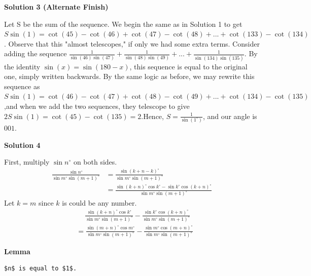 \begin{enumerate}
 



\textbf{Solution 3 (Alternate Finish)}

Let S be the sum of the sequence. We begin the same as in Solution 1 to get$S\sin(1)=\cot(45)-\cot(46)+\cot(47)-\cot(48)+...+\cot(133)-\cot(134)$. Observe that this "almost telescopes," if only we had some extra terms. Consider adding the sequence $\frac{1}{\sin(46)\sin(47)}+\frac{1}{\sin(48)\sin(49)}+...+\frac{1}{\sin(134)\sin(135)}$. By the identity $\sin(x)=\sin(180-x)$, this sequence is equal to the original one, simply written backwards. By the same logic as before, we may rewrite this sequence as$S\sin(1)=\cot(46)-\cot(47)+\cot(48)-\cot(49)+...+\cot(134)-\cot(135)$,and when we add the two sequences, they telescope to give $2S\sin(1)=\cot(45)-\cot(135)=2$.Hence, $S=\frac{1}{\sin(1^\circ)}$, and our angle is $\boxed{001}$.

 



\textbf{Solution 4}

First, multiply $\sin n^{\circ}$ on both sides.
 \begin{align*}     \frac{\sin n^\circ}{\sin m^\circ \sin (m+1)^\circ}     &= \frac{\sin (k+n-k)^\circ}{\sin m^\circ \sin (m+1)^\circ} \\     &= \frac{\sin (k+n)^\circ \cos k^\circ - \sin k^\circ \cos (k+n)^\circ}{\sin m^\circ \sin (m+1)^\circ} \end{align*}
Let $k = m$ since $k$ is could be any number.
 \begin{align*}     &\quad \ \frac{\sin (k+n)^\circ \cos k^\circ}{\sin m^\circ \sin (m+1)^\circ} - \frac{\sin k^\circ \cos (k+n)^\circ}{\sin m^\circ \sin (m+1)^\circ} \\[0.5em]     &=\frac{\sin (m+n)^\circ \cos m^\circ}{\sin m^\circ \sin (m+1)^\circ} - \frac{\sin m^\circ \cos (m+n)^\circ}{\sin m^\circ \sin (m+1)^\circ} \end{align*}


 \textbf{Lemma} \begin{verbatim}
$n$ is equal to $1$.
\end{verbatim}


\end{enumerate}
